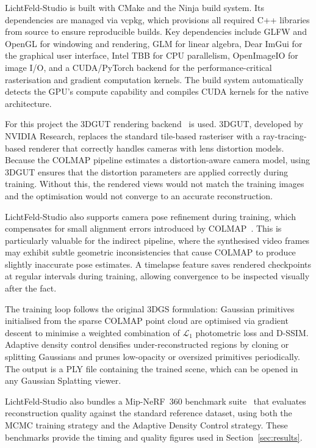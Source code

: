 \documentclass[conference]{IEEEtran}
\begin{document}
LichtFeld-Studio is built with CMake and the Ninja build system. Its dependencies are managed via vcpkg, which provisions all required C++ libraries from source to ensure reproducible builds. Key dependencies include GLFW and OpenGL for windowing and rendering, GLM for linear algebra, Dear ImGui for the graphical user interface, Intel TBB for CPU parallelism, OpenImageIO for image I/O, and a CUDA/PyTorch backend for the performance-critical rasterisation and gradient computation kernels. The build system automatically detects the GPU's compute capability and compiles CUDA kernels for the native architecture.

For this project the 3DGUT rendering backend~\cite{gut_paper} is used. 3DGUT, developed by NVIDIA Research, replaces the standard tile-based rasteriser with a ray-tracing-based renderer that correctly handles cameras with lens distortion models. Because the COLMAP pipeline estimates a distortion-aware camera model, using 3DGUT ensures that the distortion parameters are applied correctly during training. Without this, the rendered views would not match the training images and the optimisation would not converge to an accurate reconstruction.

LichtFeld-Studio also supports camera pose refinement during training, which compensates for small alignment errors introduced by COLMAP~\cite{3rgs_paper}. This is particularly valuable for the indirect pipeline, where the synthesised video frames may exhibit subtle geometric inconsistencies that cause COLMAP to produce slightly inaccurate pose estimates. A timelapse feature saves rendered checkpoints at regular intervals during training, allowing convergence to be inspected visually after the fact.

The training loop follows the original 3DGS formulation: Gaussian primitives initialised from the sparse COLMAP point cloud are optimised via gradient descent to minimise a weighted combination of $\mathcal{L}_1$ photometric loss and D-SSIM. Adaptive density control densifies under-reconstructed regions by cloning or splitting Gaussians and prunes low-opacity or oversized primitives periodically. The output is a PLY file containing the trained scene, which can be opened in any Gaussian Splatting viewer.

LichtFeld-Studio also bundles a Mip-NeRF~360 benchmark suite~\cite{mipnerf360_paper} that evaluates reconstruction quality against the standard reference dataset, using both the MCMC training strategy and the Adaptive Density Control strategy. These benchmarks provide the timing and quality figures used in Section~\ref{sec:results}.
\end{document}
